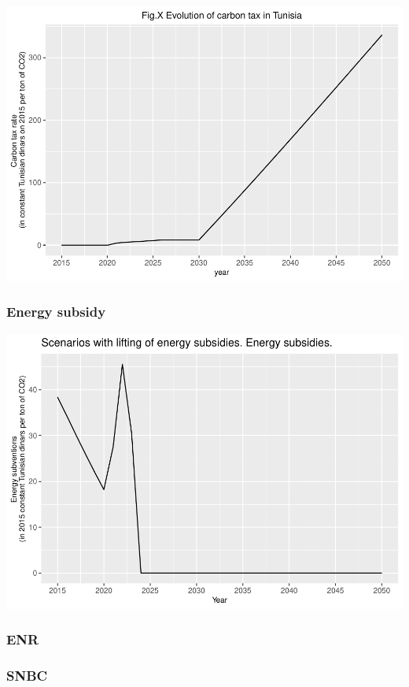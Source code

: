 \documentclass[
]{article}
\begin{document}
\includegraphics{Modele-ThreeMe-Tunisie_Sequeira_Valilou_Wang_files/figure-latex/unnamed-chunk-6-1.pdf}

\hypertarget{energy-subsidy}{%
\subsubsection{Energy subsidy}\label{energy-subsidy}}

\includegraphics{Modele-ThreeMe-Tunisie_Sequeira_Valilou_Wang_files/figure-latex/unnamed-chunk-7-1.pdf}

\hypertarget{enr}{%
\subsubsection{ENR}\label{enr}}

\hypertarget{snbc}{%
\subsubsection{SNBC}\label{snbc}}
\end{document}
